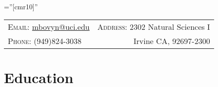\documentclass[letterpaper,10pt]{article} %
\begin{document}

\font\fb=''[cmr10]'' %


\par{\bigskip\par} %

\begin{tabular*}{\textwidth}{@{\extracolsep{\fill}} lr}
\textsc{Email:} \href{mailto:mbovyn@uci.edu}{mbovyn@uci.edu} &
\textsc{Address:} 2302 Natural Sciences I \\
\textsc{Phone:} (949)824-3038 &
Irvine CA, 92697-2300

\end{tabular*}


\section{Education}

%
%
%
%
%
%
%
\end{document}
